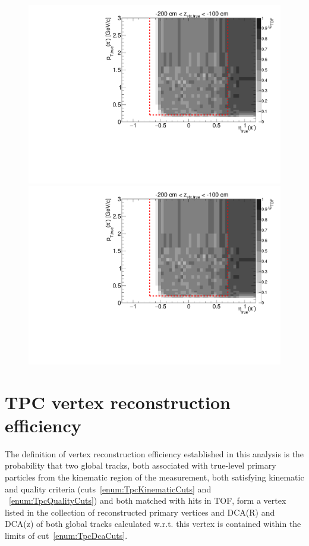 \begin{figure}[hb]
{  \includegraphics[width=\linewidth,page=16]{graphics/eff/Eff2D_TOF_pion_Minus.pdf}\\
  \includegraphics[width=\linewidth,page=18]{graphics/eff/Eff2D_TOF_pion_Minus.pdf}
}%
\end{figure}


\section{TPC vertex reconstruction efficiency}\label{sec:tpcVxRecoEff}

The definition of vertex reconstruction efficiency established in this analysis is the probability that two global tracks, both associated with true-level primary particles from the kinematic region of the measurement, both satisfying kinematic and quality criteria (cuts~\ref{enum:TpcKinematicCuts} and ~\ref{enum:TpcQualityCuts}) and both matched with hits in TOF, form a vertex listed in the collection of reconstructed primary vertices and DCA(R) and DCA(z) of both global tracks calculated w.r.t. this vertex is contained within the limits of cut~\ref{enum:TpcDcaCuts}.